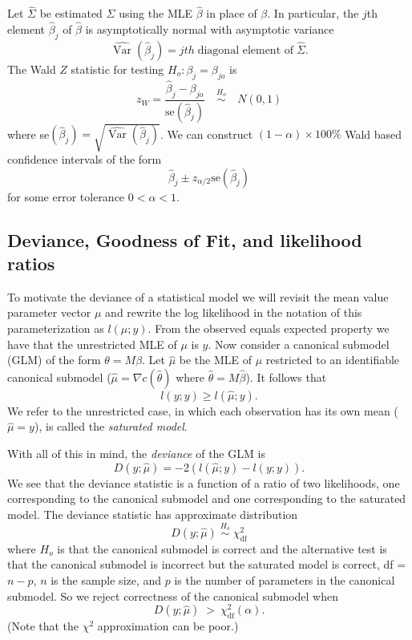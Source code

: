 \documentclass[12pt]{article}
\DeclareMathOperator{\Var}{Var}
\begin{document}
Let $\widehat\Sigma$ be estimated $\Sigma$ using the MLE $\hat\beta$ in place of $\beta$. In particular, the $j$th element $\hat\beta_j$ of $\hat\beta$ is asymptotically normal with asymptotic variance
$$
  \widehat{\Var}(\hat\beta_j) = jth \; \text{diagonal element of} \; \widehat\Sigma.
$$
The Wald $Z$ statistic for testing $H_o:\beta_j = \beta_{jo}$ is 
$$
  z_W = \frac{\hat\beta_j - \beta_{jo}}{\text{se}(\hat\beta_j)} \quad \overset{H_o}{\sim} \quad N(0,1)
$$
where se$(\hat\beta_j) = \sqrt{\widehat{\Var}(\hat\beta_j)}$. We can construct $(1-\alpha)\times 100\%$ Wald based confidence intervals of the form
$$
  \hat\beta_j \pm z_{\alpha/2}\text{se}(\hat\beta_j)
$$
for some error tolerance $0 < \alpha < 1$.


\subsection*{Deviance, Goodness of Fit, and likelihood ratios}

To motivate the deviance of a statistical model we will revisit the mean value parameter vector $\mu$ and rewrite the log likelihood in the notation of this parameterization as $l(\mu;y)$. From the observed equals expected property we have that the unrestricted MLE of $\mu$ is $y$. Now consider a canonical submodel (GLM) of the form $\theta = M\beta$. Let $\hat\mu$ be the MLE of $\mu$ restricted to an identifiable canonical submodel ($\hat{\mu} = \nabla c(\hat\theta)$ where $\hat\theta = M\hat\beta$). It follows that
$$
  l(y;y) \geq l(\hat\mu; y).
$$
We refer to the unrestricted case, in which each observation has its own mean ($\hat\mu = y$), is called the \emph{saturated model}.

With all of this in mind, the \emph{deviance} of the GLM is
$$
  D(y;\hat\mu) = -2\left(l(\hat\mu;y) - l(y;y)\right).
$$
We see that the deviance statistic is a function of a ratio of two likelihoods, one corresponding to the canonical submodel and one corresponding to the saturated model. The deviance statistic has approximate distribution
$$
  D(y;\hat\mu) \; \overset{H_o}{\sim} \; \chi^2_{\text{df}}
$$
where $H_o$ is that the canonical submodel is correct and the alternative test is that the canonical submodel is incorrect but the saturated model is correct, df = $n - p$, $n$ is the sample size, and $p$ is the number of parameters in the canonical submodel. So we reject correctness of the canonical submodel when
$$
  D(y;\hat\mu) \; > \: \chi^2_{\text{df}}(\alpha).
$$
(Note that the $\chi^2$ approximation can be poor.)
\end{document}
